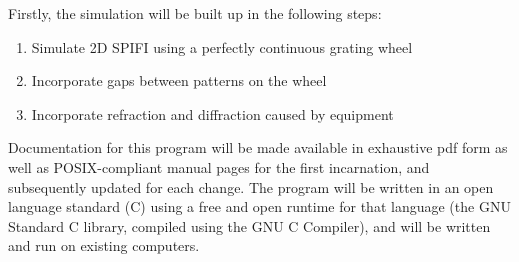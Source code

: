 \documentclass[12pt]{article}
\begin{document}
Firstly, the simulation will be built up in the following steps:
\begin{enumerate}
\item Simulate 2D SPIFI using a perfectly continuous grating wheel
\item Incorporate gaps between patterns on the wheel
\item Incorporate refraction and diffraction caused by equipment
\end{enumerate}
Documentation for this program will be made available in exhaustive pdf 
form as well as POSIX-compliant manual pages for the first incarnation, and
subsequently updated for each change. The program will be written in an
open language standard (C) using a free and open runtime for that 
language (the GNU Standard C library, compiled using the GNU C Compiler),
and will be written and run on existing computers.
\end{document}
